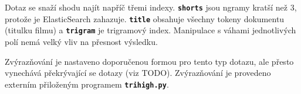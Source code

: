 \documentclass[11pt,letterpaper,oneside,openright]{book}
\newcommand{\bftt}[1]{\texttt{\textbf{#1}}}
\begin{document}
Dotaz se snaží shodu najít napříč třemi indexy. \bftt{shorts} jsou
ngramy kratší než $3$, protože je ElasticSearch zahazuje. \bftt{title}
obsahuje všechny tokeny dokumentu (titulku filmu) a \bftt{trigram} je
trigramový index. Manipulace s váhami jednotlivých polí nemá velký vliv
na přesnost výsledku.

Zvýrazňování je nastaveno doporučenou formou pro tento typ dotazu, ale
přesto vynechává překrývající se dotazy (viz TODO). Zvýrazňování je
provedeno externím přiloženým programem \bftt{trihigh.py}.




\backmatter
\end{document}
